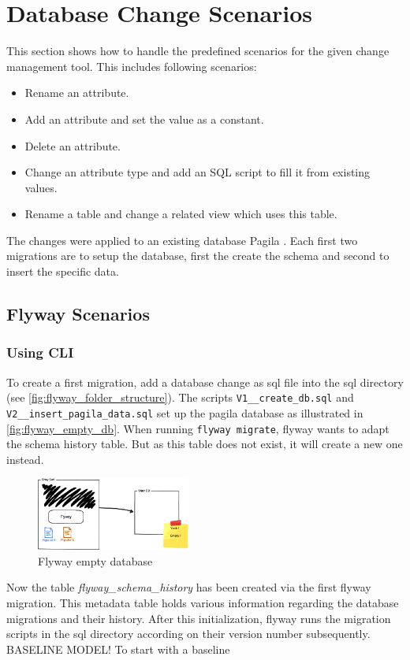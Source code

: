 

\chapter{Database Change Scenarios}
This section shows how to handle the predefined scenarios for the given change management tool. This includes following scenarios: 

\begin{itemize}
	\item Rename an attribute.
	\item Add an attribute and set the value as a constant.
	\item Delete an attribute.
	\item Change an attribute type and add an SQL script to fill it from existing values.
	\item Rename a table and change a related view which uses this table.
\end{itemize}

The changes were applied to an existing database Pagila \cite{Hillyer}. Each first two migrations are to setup the database, first the create the schema and second to insert the specific data.

\section{Flyway Scenarios}

\subsection{Using CLI}
%
To create a first migration, add a database change as sql file into the sql directory (see \autoref{fig:flyway_folder_structure}). 
The scripts \texttt{V1\_\_create\_db.sql} and \texttt{V2\_\_insert\_pagila\_data.sql} set up the pagila database as illustrated in \autoref{fig:flyway_empty_db}. When running  \texttt{flyway migrate}, flyway wants to adapt the schema history table. But as this table does not exist, it will create a new one instead.


 

\begin{figure}[H]
	\centering
	\includegraphics[width=0.45\textwidth]{./chapters/scenarios/images/EmptyDb}
	\caption[Flyway empty database - Source: \cite{FlywayGetStarted}]{Flyway empty database}
	 \label{fig:flyway_empty_db}
\end{figure}
Now the table \textit{flyway\_schema\_history} has been created via the first flyway migration. This metadata table holds various information regarding the database migrations and their history. After this initialization, flyway runs the migration scripts in the sql directory according on their version number subsequently. 
BASELINE MODEL! To start with a baseline

